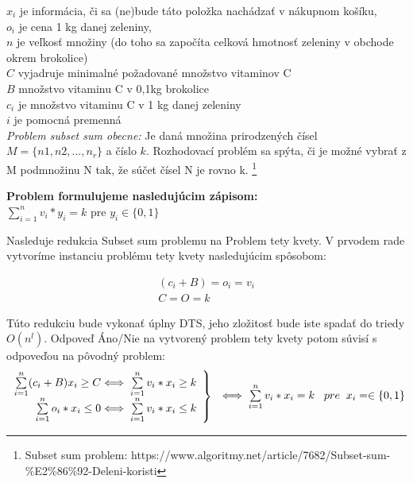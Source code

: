 \documentclass[11pt,a4paper]{article}
\begin{document}
$ x_i $ je informácia, či sa (ne)bude táto položka nachádzať v nákupnom košíku, \\

$ o_i $ je cena 1 kg danej zeleniny, \\

$ n $ je veľkosť množiny (do toho sa započíta celková hmotnosť zeleniny v obchode okrem brokolice) \\

$ C $ vyjadruje minimalné požadované množstvo vitaminov C \\

$ B $ množstvo vitaminu C v 0,1kg brokolice \\

$c_i$ je množstvo vitaminu C v 1 kg danej zeleniny \\

$ i $ je pomocná premenná \\

\textit{Problem subset sum obecne:} Je daná množina prirodzených čísel $ M = \{n1, n2, ..., n_r\} $ a číslo $k$. Rozhodovací problém sa spýta, či je možné vybrať z M podmnožinu N tak, že súčet čísel N je rovno k. \footnote{Subset sum problem: https://www.algoritmy.net/article/7682/Subset-sum-\%E2\%86\%92-Deleni-koristi}

\textbf{Problem formulujeme nasledujúcim zápisom:} \\

$ \sum\limits_{i=1}^{n} v_i * y_i = k $ pre $ y_i \in \{0, 1\}$

Nasleduje redukcia Subset sum problemu na Problem tety kvety. V prvodem rade vytvoríme instanciu problému tety kvety nasledujúcim spôsobom:

\begin{align*}
    (c_i + B) = o_i = v_i \\
    C = O = k
\end{align*}

Túto redukciu bude vykonať úplny DTS, jeho zložitosť bude iste spadať do triedy $O(n^l)$.
Odpoveď Áno/Nie na vytvorený problem tety kvety potom súvisí s odpoveďou na pôvodný problem: \\

    \begin{align*}
        \left.
        \begin{array}{r@{}l}
            \sum\limits_{i=1}^{n} (c_i + B) x_i \geq C & \iff \sum\limits_{i=1}^{n} v_i * x_i \geq k \\
            \sum\limits_{i=1}^{n} o_i * x_i \leq 0 & \iff \sum\limits_{i=1}^{n} v_i * x_i \leq k
        \end{array}
        \right\rbrace
        \begin{array}{r@{}l}
            \iff \sum\limits_{i=1}^{n} v_i * x_i = k \hspace{0,3cm}pre \hspace{0,2cm} x_i =\in \{0, 1\} 
        \end{array}
    \end{align*}
\end{document}
